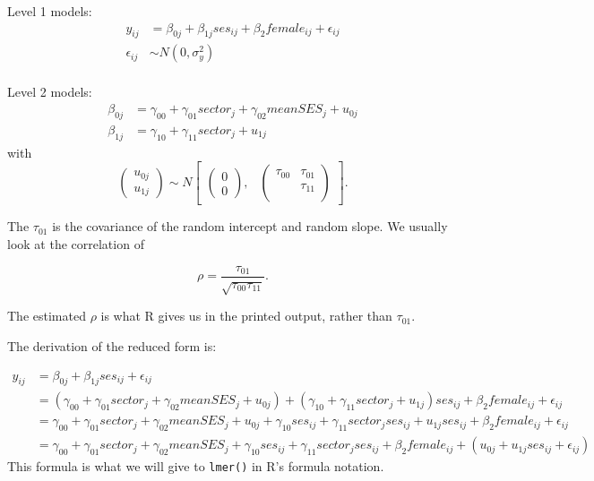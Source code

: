 \documentclass[
  letterpaper,
  DIV=11,
  numbers=noendperiod]{scrreprt}
\begin{document}
Level 1 models: \[
\begin{aligned}
y_{ij} &= \beta_{0j} + \beta_{1j} ses_{ij} + \beta_2 female_{ij} +  \epsilon_{ij} \\
\epsilon_{ij} &\sim N( 0, \sigma^2_y ) \\
\end{aligned}
\]

Level 2 models: \[
\begin{aligned}
\beta_{0j} &= \gamma_{00} + \gamma_{01} sector_j + \gamma_{02} meanSES_j + u_{0j} \\
\beta_{1j} &= \gamma_{10} + \gamma_{11} sector_j + u_{1j} 
\end{aligned}
\] with \[
\begin{pmatrix} u_{0j} \\
u_{1j}
\end{pmatrix} \sim  N
\begin{bmatrix}
\begin{pmatrix}
0 \\
0
\end{pmatrix}\!\!,&
\begin{pmatrix}
\tau_{00} & \tau_{01}\\
 & \tau_{11} \\
\end{pmatrix}
\end{bmatrix} .
\]

The \(\tau_{01}\) is the covariance of the random intercept and random
slope. We usually look at the correlation of

\[ \rho = \frac{ \tau_{01} }{ \sqrt{ \tau_{00} \tau_{11} } } . \]

The estimated \(\rho\) is what R gives us in the printed output, rather
than \(\tau_{01}\).

The derivation of the reduced form is:

\[
\begin{aligned}
y_{ij} &= \beta_{0j} + \beta_{1j} ses_{ij} + \epsilon_{ij}\\
&= \left( \gamma_{00} + \gamma_{01} sector_j + \gamma_{02} meanSES_j + u_{0j} \right)+ (\gamma_{10} + \gamma_{11} sector_j + u_{1j}) ses_{ij} + \beta_2 female_{ij} + \epsilon_{ij} \\
&= \gamma_{00} + \gamma_{01} sector_j + \gamma_{02} meanSES_j  + u_{0j}  + \gamma_{10}ses_{ij} + \gamma_{11} sector_j ses_{ij} + u_{1j} ses_{ij} + \beta_2 female_{ij} +  \epsilon_{ij}  \\
&= \gamma_{00} + \gamma_{01} sector_j + \gamma_{02} meanSES_j +  \gamma_{10}ses_{ij} + \gamma_{11} sector_j ses_{ij} + \beta_2 female_{ij}  + \left(u_{0j} + u_{1j} ses_{ij} + \epsilon_{ij} \right) 
\end{aligned}
\] This formula is what we will give to \texttt{lmer()} in R's formula
notation.
\end{document}
